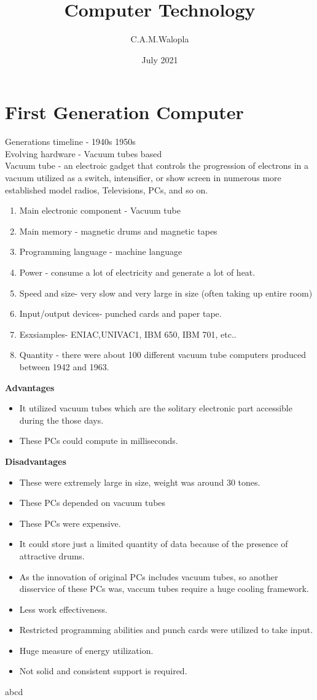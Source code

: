 \documentclass[a4paper,12pt]{article}
\begin{document}
\title{Computer Technology}
\author{C.A.M.Walopla}
\date{July 2021}
\section{First Generation Computer} 
Generations timeline - 1940s 1950s \\ 
Evolving hardware - Vacuum tubes based \\ 
Vacuum tube - an electroic gadget that controls the progression of electrons in a vacuum utilized as a switch, intensifier, or show screen in numerous more established model radios, Televisions, PCs, and so on.

\begin{enumerate}
\item Main electronic component - Vacuum tube
\item Main memory - magnetic drums and magnetic tapes
\item Programming language - machine language
\item Power - consume a lot of electricity and generate a lot of heat.
\item Speed and size- very slow and very large in size (often taking up entire room)
\item Input/output devices- punched cards and paper tape.
\item Esxsiamples- ENIAC,UNIVAC1, IBM 650, IBM 701, etc..
\item Quantity - there were about 100 different vacuum tube computers produced between 1942 and 1963.
\end{enumerate}

\textbf{Advantages} \\ 
\begin{itemize}
\item It utilized vacuum tubes which are the solitary electronic part accessible during the those days.
\item These PCs could compute in milliseconds.
\end{itemize}

\textbf{Disadvantages}
\begin{itemize}
\item These were extremely large in size, weight was around 30 tones.
\item These PCs depended on vacuum tubes
\item These PCs were expensive.
\item It could store just a limited quantity of data because of the presence of attractive drums.
\item As the innovation of original PCs includes vacuum tubes, so another disservice of these PCs was, vaccum tubes require a huge cooling framework.
\item Less work effectiveness.
\item Restricted programming abilities and punch cards were utilized to take input.
\item Huge measure of energy utilization.
\item Not solid and consistent support is required.
\end{itemize}
abcd
\end{document}
